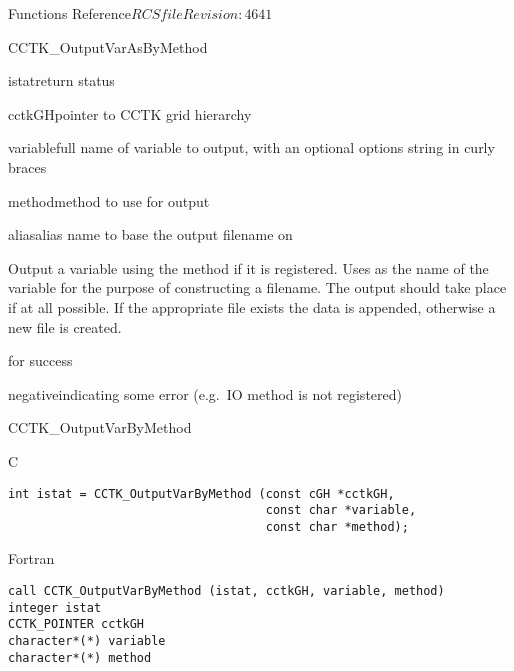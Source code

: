 \begin{cactuspart}{ Functions Reference}{$RCSfile$}{$Revision: 4641 $}
\begin{FunctionDescription}{CCTK\_OutputVarAsByMethod}
\begin{ParameterSection}
\begin{Parameter}{istat}return status\end{Parameter}
\begin{Parameter}{cctkGH}pointer to CCTK grid hierarchy\end{Parameter}
\begin{Parameter}{variable}full name of variable to output, with an optional
options string in curly braces\end{Parameter}
\begin{Parameter}{method}method to use for output\end{Parameter}
\begin{Parameter}{alias}alias name to base the output filename on\end{Parameter}
\end{ParameterSection}

\begin{Discussion}
Output a variable  using the method  if it is
registered. Uses  as the name of the variable for the purpose
of constructing a filename. The output should take place if at all possible.
If the appropriate file exists the data is appended, otherwise a new
file is created.
\end{Discussion}

\begin{ErrorSection}
\begin{Error}{0}for success\end{Error}
\begin{Error}{negative}indicating some error (e.g.\ IO method is not registered)\end{Error}
\end{ErrorSection}
\end{FunctionDescription}


\begin{FunctionDescription}{CCTK\_OutputVarByMethod}
\label{CCTK-OutputVarByMethod}
\begin{SynopsisSection}
\begin{Synopsis}{C}
\begin{verbatim}
int istat = CCTK_OutputVarByMethod (const cGH *cctkGH,
                                    const char *variable,
                                    const char *method);
\end{verbatim}
\end{Synopsis}
\begin{Synopsis}{Fortran}
\begin{verbatim}
call CCTK_OutputVarByMethod (istat, cctkGH, variable, method)
integer istat
CCTK_POINTER cctkGH
character*(*) variable
character*(*) method
\end{verbatim}
\end{Synopsis}
\end{SynopsisSection}


\end{FunctionDescription}
\end{cactuspart}
